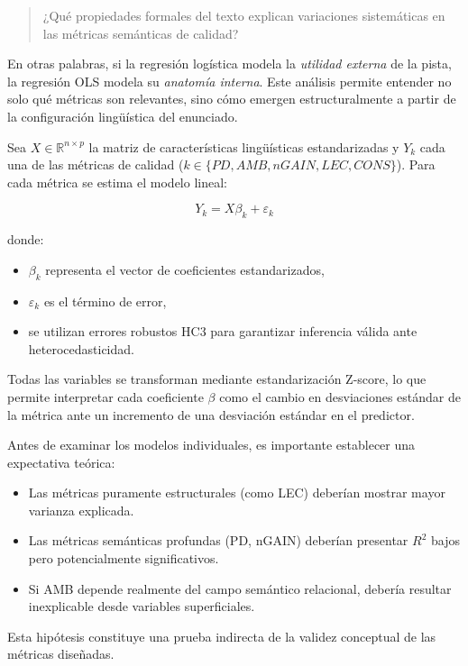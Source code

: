 \documentclass[../main.tex]{subfiles}
\begin{document}
\begin{quote}
¿Qué propiedades formales del texto explican variaciones sistemáticas en las métricas semánticas de calidad?
\end{quote}

En otras palabras, si la regresión logística modela la \textit{utilidad externa} de la pista, la regresión OLS modela su \textit{anatomía interna}. Este análisis permite entender no solo qué métricas son relevantes, sino cómo emergen estructuralmente a partir de la configuración lingüística del enunciado.

Sea $X \in \mathbb{R}^{n \times p}$ la matriz de características lingüísticas estandarizadas y $Y_k$ cada una de las métricas de calidad ($k \in \{PD, AMB, nGAIN, LEC, CONS\}$). Para cada métrica se estima el modelo lineal:

\[
Y_k = X\beta_k + \varepsilon_k
\]

donde:

\begin{itemize}
\item $\beta_k$ representa el vector de coeficientes estandarizados,
\item $\varepsilon_k$ es el término de error,
\item se utilizan errores robustos HC3 para garantizar inferencia válida ante heterocedasticidad.
\end{itemize}

Todas las variables se transforman mediante estandarización Z-score, lo que permite interpretar cada coeficiente $\beta$ como el cambio en desviaciones estándar de la métrica ante un incremento de una desviación estándar en el predictor.

Antes de examinar los modelos individuales, es importante establecer una expectativa teórica:

\begin{itemize}
\item Las métricas puramente estructurales (como LEC) deberían mostrar mayor varianza explicada.
\item Las métricas semánticas profundas (PD, nGAIN) deberían presentar $R^2$ bajos pero potencialmente significativos.
\item Si AMB depende realmente del campo semántico relacional, debería resultar inexplicable desde variables superficiales.
\end{itemize}

Esta hipótesis constituye una prueba indirecta de la validez conceptual de las métricas diseñadas.
\end{document}
